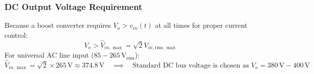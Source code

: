 \subsubsection{DC Output Voltage Requirement}
Because a boost converter requires $V_o > v_{in}(t)$ at all times for proper current control:
\begin{equation}
V_o > \hat{V}_{in,\max} = \sqrt{2} V_{in,\mathrm{rms},\max}
\end{equation}
For universal AC line input ($85 - 265\,\si{\volt}_{\mathrm{rms}}$):
\begin{equation}
\hat{V}_{in,\max} = \sqrt{2} \times 265\,\si{\volt} \approx 374.8\,\si{\volt} \quad \implies \quad \text{Standard DC bus voltage is chosen as } V_o = 380\,\si{\volt} - 400\,\si{\volt}
\end{equation}

